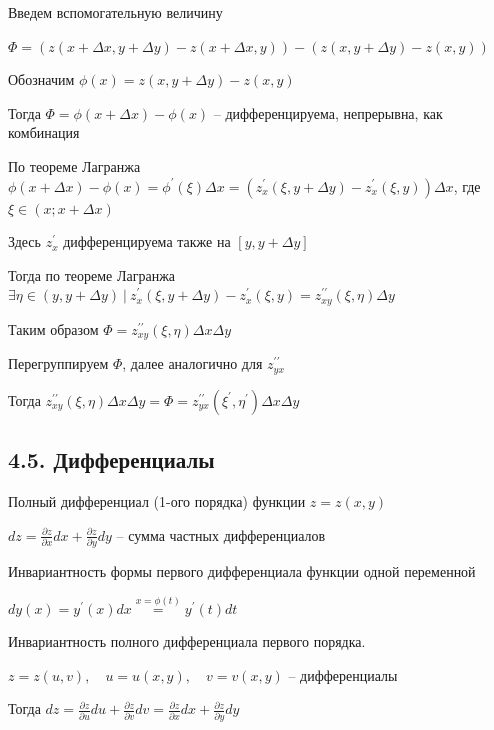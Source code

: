\documentclass[12pt]{article}
\begin{document}
    \begin{MyProof}
        Введем вспомогательную величину

        $\displaystyle \Phi = (z(x + \Delta x, y + \Delta y) - z(x + \Delta x, y)) - (z(x, y + \Delta y) - z(x, y))$

        Обозначим $\displaystyle \phi(x) = z(x, y + \Delta y) - z(x, y)$

        Тогда $\displaystyle \Phi = \phi(x + \Delta x) - \phi(x)$ -- дифференцируема, непрерывна, как комбинация

        По теореме Лагранжа $\displaystyle \phi(x + \Delta x) - \phi(x) = \phi^\prime(\xi) \Delta x = (z^\prime_x(\xi, y + \Delta y) - z^\prime_x(\xi, y)) \Delta x$, где $\displaystyle \xi \in (x; x + \Delta x)$

        Здесь $\displaystyle z^\prime_x$ дифференцируема также на $\displaystyle [y, y + \Delta y]$


        Тогда по теореме Лагранжа $\displaystyle \exists \eta \in (y, y + \Delta y) \ | \ z^\prime_x(\xi, y + \Delta y) - z^\prime_x(\xi, y) = z^{\prime\prime}_{xy} (\xi, \eta) \Delta y$

        Таким образом $\displaystyle \Phi = z^{\prime\prime}_{xy} (\xi, \eta) \Delta x \Delta y$

        Перегруппируем $\displaystyle \Phi$, далее аналогично для $\displaystyle z^{\prime\prime}_{yx}$

        Тогда $\displaystyle z^{\prime\prime}_{xy} (\xi, \eta) \Delta x \Delta y = \Phi = z^{\prime\prime}_{yx} (\xi^\prime, \eta^\prime) \Delta x \Delta y$
    \end{MyProof}

    \subsection{4.5. Дифференциалы}
    
    \hypertarget{completedifferentialoffunctionoftwovariables}{}
     Полный дифференциал (1-ого порядка) функции $\displaystyle z = z(x, y)$

    $\displaystyle dz = \frac{\partial z}{\partial x} dx + \frac{\partial z}{\partial y} dy$ -- сумма частных дифференциалов

     Инвариантность формы первого дифференциала функции одной переменной

    $\displaystyle dy(x) = y^\prime(x)dx \stackrel{x = \phi(t)}{=} y^\prime(t)dt$

    \hypertarget{invariantofdifferentialoffunctionoftwovariables}{}
    \begin{MyTheorem}
        \Ths Инвариантность полного дифференциала первого порядка.

        $\displaystyle z = z(u, v), \quad u = u(x, y), \quad v = v(x, y)$ -- дифференциалы

        Тогда $\displaystyle dz = \frac{\partial z}{\partial u}du + \frac{\partial z}{\partial v} dv = \frac{\partial z}{\partial x} dx + \frac{\partial z}{\partial y} dy$
    \end{MyTheorem}
\end{document}
